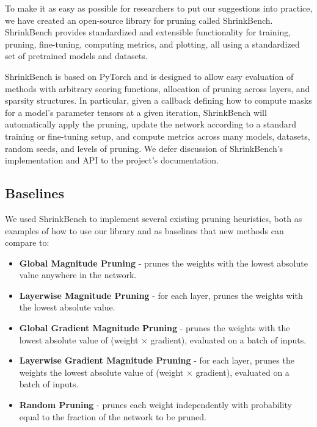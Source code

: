 To make it as easy as possible for researchers to put our suggestions into practice, we have created an open-source library for pruning called ShrinkBench. %
ShrinkBench provides standardized and extensible functionality for training, pruning, fine-tuning, computing metrics, and plotting, all using a standardized set of pretrained models and datasets.

ShrinkBench is based on PyTorch \cite{pytorch} and is designed to allow easy evaluation of methods with arbitrary scoring functions, allocation of pruning across layers, and sparsity structures. In particular, given a callback defining how to compute masks for a model's parameter tensors at a given iteration, ShrinkBench will automatically apply the pruning, update the network according to a standard training or fine-tuning setup, and compute metrics across many models, datasets, random seeds, and levels of pruning.
We defer discussion of ShrinkBench's implementation and API to the project's documentation.

\subsection{Baselines}

We used ShrinkBench to implement several existing pruning heuristics, both as examples of how to use our library and as baselines that new methods can compare to:
\begin{itemize}[leftmargin=4mm]
    \itemsep-1pt
    \vspace{-2mm}
    \item \textbf{Global Magnitude Pruning} - prunes the weights with the lowest absolute value anywhere in the network.
    \item \textbf{Layerwise Magnitude Pruning} - for each layer, prunes the weights with the lowest absolute value.
    \item \textbf{Global Gradient Magnitude Pruning} - prunes the weights with the lowest absolute value of (weight $\times$ gradient), evaluated on a batch of inputs.
    \item \textbf{Layerwise Gradient Magnitude Pruning} - for each layer, prunes the weights the lowest absolute value of (weight $\times$ gradient), evaluated on a batch of inputs.
    \item \textbf{Random Pruning} - prunes each weight independently with probability equal to the fraction of the network to be pruned.
\end{itemize}
\vspace{-2mm}

